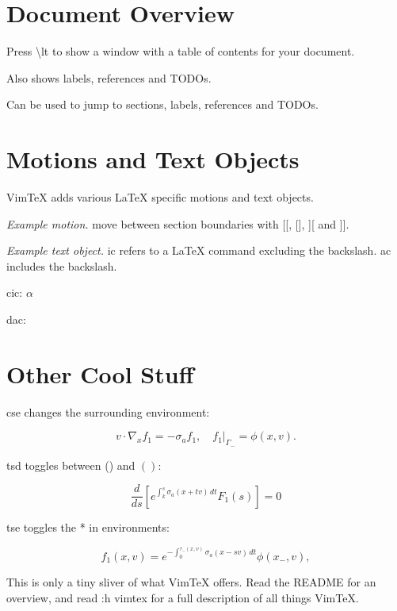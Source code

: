 \documentclass{article}
\newcommand{\lt}{\textbackslash{}lt }
\begin{document}
\section{Document Overview}

Press \lt to show a window with a table of contents for your document.

Also shows labels, references and TODOs. 

Can be used to jump to sections, labels, references and TODOs.















\section{Motions and Text Objects}

VimTeX adds various LaTeX specific motions and text objects.

\emph{Example motion.} move between section boundaries with [[, [], ][ and ]].

\emph{Example text object.} ic refers to a LaTeX command excluding the
backslash. ac includes the backslash.

cic: \( \alpha \)

dac: \(  \)











\section{Other Cool Stuff}

cse changes the surrounding environment:

\begin{equation}
  v \cdot \nabla_x f_1 = -\sigma_a f_1, \quad f_1 \rvert_{\Gamma_-} = \phi(x,v).
\end{equation}

tsd toggles between () and \( \left( \right) \):

\begin{equation*}
  \frac{d}{ds} \left[ e^{\int_k^s \sigma_a(x + tv)\,dt} F_1(s) \right] = 0
\end{equation*}

tse toggles the * in environments:

\begin{equation}
  f_1(x, v) = e^{-\int_0^{\tau_-(x, v)} \sigma_a(x - sv)\,dt} \phi(x_-, v),
\end{equation}

This is only a tiny sliver of what VimTeX offers.
Read the README for an overview, and read :h vimtex for a full description of
all things VimTeX.
\end{document}
